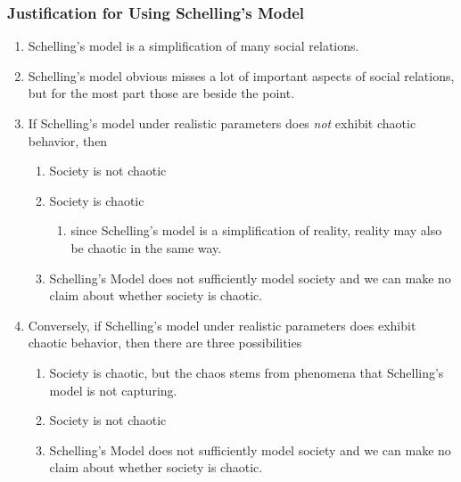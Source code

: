 \documentclass[11pt, handout]{beamer}
\begin{document}
\begin{frame}
    \frametitle{Justification for Using Schelling's Model}
    \begin{enumerate}
        \item Schelling's model is a simplification of many social relations.
        \item Schelling's model obvious misses a lot of important aspects of social relations, but for the most part those are beside the point.
        \item If Schelling's model under realistic parameters does \emph{not} exhibit chaotic behavior, then
            \begin{enumerate}
                \item Society is not chaotic
                \item Society is chaotic
                    \begin{enumerate}
                        \item since Schelling's model is a simplification of reality, reality may also be chaotic in the same way.
                    \end{enumerate}
                \item Schelling's Model does not sufficiently model society and we can make no claim about whether society is chaotic.
            \end{enumerate}
        \item Conversely, if Schelling's model under realistic parameters does exhibit chaotic behavior, then there are three possibilities
            \begin{enumerate}
                \item Society is chaotic, but the chaos stems from phenomena that Schelling's model is not capturing.
                \item Society is not chaotic
                \item Schelling's Model does not sufficiently model society and we can make no claim about whether society is chaotic.
            \end{enumerate}
    \end{enumerate}
\end{frame}
\end{document}
